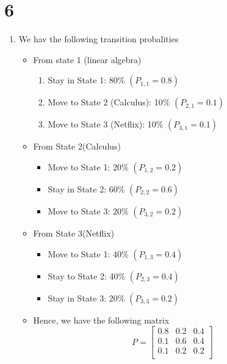 \documentclass{article}
\begin{document}
        \section*{6}
        \begin{enumerate}[label = ({\alph*})]
            \item We hav the following transition probalities
            \begin{itemize}
                \item From state 1 (linear algebra)
                \begin{enumerate}
                    \item Stay in State 1: 80\% \((P_{1,1} = 0.8)\)
                    \item Move to State 2 (Calculus): 10\% \((P_{2, 1} = 0.1)\)
                    \item Move to State 3 (Netflix): 10\% \((P_{3, 1} = 0.1)\)
                \end{enumerate}
                \item From State 2(Calculus)
                \begin{itemize}
                    \item Move to State 1: 20\% \((P_{1, 2} = 0.2)\)
                    \item Stay in State 2: 60\% \((P_{2, 2} = 0.6)\)
                    \item Move to State 3: 20\% \((P_{3, 2} = 0.2)\)
                \end{itemize}
                \item From State 3(Netflix)
                \begin{itemize}
                    \item Move to State 1: 40\% \((P_{1, 3} = 0.4)\)
                    \item Stay to State 2: 40\% \((P_{2, 3} = 0.4)\)
                    \item Stay in State 3: 20\% \((P_{3, 3} = 0.2)\)
                \end{itemize}
                \item Hence, we have the following matrix
                \[P = \begin{bmatrix}
                    0.8 & 0.2 & 0.4 \\
                    0.1 & 0.6 & 0.4 \\
                    0.1 & 0.2 & 0.2 \\
                \end{bmatrix}
\]
\end{itemize}
\end{enumerate}
\end{document}
